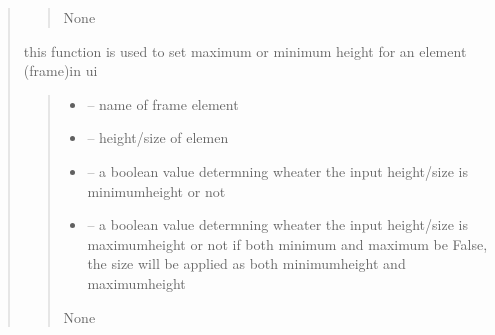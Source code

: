 \documentclass[letterpaper,10pt,english]{sphinxmanual}
\begin{document}
\begin{quote}
\begin{savenotes}
\begin{fulllineitems}
\begin{savenotes}
\begin{fulllineitems}
\begin{quote}
\begin{description}
\sphinxAtStartPar
None

\end{description}\end{quote}

\end{fulllineitems}\end{savenotes}


\begin{savenotes}\begin{fulllineitems}
\label{\detokenize{setting/setting_UI:oxin.setting_UI.UI_main_window.set_size}}
\pysigstartsignatures
{}
\pysigstopsignatures
\sphinxAtStartPar
this function is used to set maximum or minimum height for an element (frame)in ui
\begin{quote}\begin{description}
\begin{itemize}
\item {} 
\sphinxAtStartPar
{} – name of frame element

\item {} 
\sphinxAtStartPar
{} – height/size of elemen

\item {} 
\sphinxAtStartPar
{} – a boolean value determning wheater the input height/size is minimumheight or not

\item {} 
\sphinxAtStartPar
{} – a boolean value determning wheater the input height/size is maximumheight or not
if both minimum and maximum be False, the size will be applied as both minimumheight and maximumheight

\end{itemize}

\sphinxAtStartPar
None

\end{description}\end{quote}


\end{fulllineitems}
\end{savenotes}
\end{fulllineitems}
\end{savenotes}
\end{quote}
\end{document}
